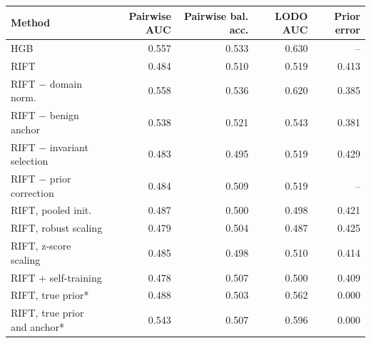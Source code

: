 \begin{tabular}{lrrrr}
\toprule
Method & Pairwise AUC & Pairwise bal. acc. & LODO AUC & Prior error \\
\midrule
HGB & 0.557 & 0.533 & 0.630 & -- \\
RIFT & 0.484 & 0.510 & 0.519 & 0.413 \\
RIFT $-$ domain norm. & 0.558 & 0.536 & 0.620 & 0.385 \\
RIFT $-$ benign anchor & 0.538 & 0.521 & 0.543 & 0.381 \\
RIFT $-$ invariant selection & 0.483 & 0.495 & 0.519 & 0.429 \\
RIFT $-$ prior correction & 0.484 & 0.509 & 0.519 & -- \\
RIFT, pooled init. & 0.487 & 0.500 & 0.498 & 0.421 \\
RIFT, robust scaling & 0.479 & 0.504 & 0.487 & 0.425 \\
RIFT, z-score scaling & 0.485 & 0.498 & 0.510 & 0.414 \\
RIFT + self-training & 0.478 & 0.507 & 0.500 & 0.409 \\
RIFT, true prior* & 0.488 & 0.503 & 0.562 & 0.000 \\
RIFT, true prior and anchor* & 0.543 & 0.507 & 0.596 & 0.000 \\
\bottomrule
\end{tabular}
